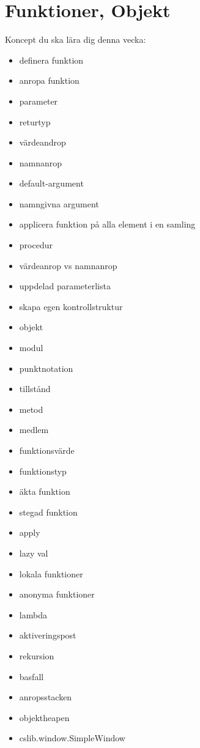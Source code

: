 \chapter{Funktioner, Objekt}\label{chapter:W03}
Koncept du ska lära dig denna vecka:
\begin{multicols}{2}\begin{itemize}[nosep,label={$\square$},leftmargin=*]
\item definera funktion
\item anropa funktion
\item parameter
\item returtyp
\item värdeandrop
\item namnanrop
\item default-argument
\item namngivna argument
\item applicera funktion på alla element i en samling
\item procedur
\item värdeanrop vs namnanrop
\item uppdelad parameterlista
\item skapa egen kontrollstruktur
\item objekt
\item modul
\item punktnotation
\item tillstånd
\item metod
\item medlem
\item funktionsvärde
\item funktionstyp
\item äkta funktion
\item stegad funktion
\item apply
\item lazy val
\item lokala funktioner
\item anonyma funktioner
\item lambda
\item aktiveringspost
\item rekursion
\item basfall
\item anropsstacken
\item objektheapen
\item cslib.window.SimpleWindow\end{itemize}\end{multicols}

